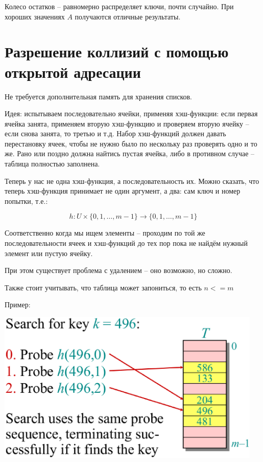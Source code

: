 \documentclass[a4paper,11pt]{article}
\begin{document}
Колесо остатков -- равномерно распределяет ключи, почти случайно. При хороших
значениях $A$ получаются отличные результаты.

\section{Разрешение коллизий с помощью открытой адресации}

Не требуется дополнительная память для хранения списков.

Идея: испытываем последовательно ячейки, применяя хэш-функции: если первая
ячейка занята, применяем вторую хэш-функцию и проверяем вторую ячейку -- если
снова занята, то третью и т.д. Набор хэш-функций должен давать перестановку
ячеек, чтобы не нужно было по нескольку раз проверять одно и то же. Рано или
поздно должна найтись пустая ячейка, либо в противном случае -- таблица
полностью заполнена.

Теперь у нас не одна хэш-функция, а последовательность их. Можно сказать, что
теперь хэш-функция принимает не один аргумент, а два: сам ключ и номер попытки,
т.е.:

$$
h \colon U \times \lbrace 0, 1, \ldots, m - 1 \rbrace \to \lbrace 0, 1,
\ldots, m - 1 \rbrace
$$

Соответственно когда мы ищем элементы -- проходим по той же последовательности
ячеек и хэш-функций до тех пор пока не найдём нужный элемент или пустую ячейку.

При этом существует проблема с удалением -- оно возможно, но сложно.

Также стоит учитывать, что таблица может запониться, то есть $n <= m$

Пример:

\begin{center}
\includegraphics[width=5in]{lecture7/open-addressing.eps}
\end{center}
\end{document}
